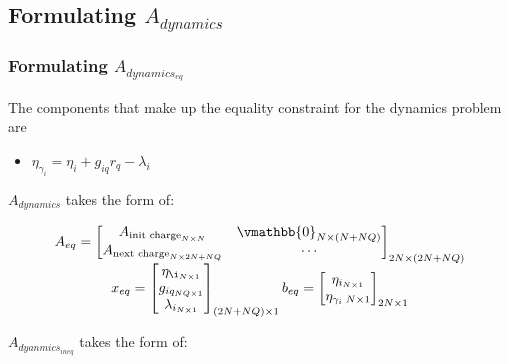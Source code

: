 \documentclass[letterpaper, 10pt, conference]{IEEEtran}
\begin{document}
\subsection{Formulating $A_{dynamics}$}

\subsubsection{Formulating $A_{dynamics_{eq}}$}
The components that make up the equality constraint for the dynamics problem are

\begin{itemize}
    \item
    $\eta_{\gamma_i} = \eta_i + g_{iq} r_q - \lambda_i$
\end{itemize}

$A_{dynamics}$ takes the form of:

\begin{equation}
\begin{array}{c}
	A_{eq} =
	\begin{bmatrix}
		A_{\textrm{init charge}_{N \times N}}       & \vmathbb{0}_{N \times (N+NQ)} \\
		A_{\textrm{next charge}_{N \times 2N + NQ}} & \cdots                       \\
	\end{bmatrix}_{2N \times (2N + NQ)} \\
	x_{eq} =
	\begin{bmatrix}
		\eta_{\i_{N \times 1}}   \\
		g_{iq_{NQ \times 1}}     \\
		\lambda_{i_{N \times 1}} \\
	\end{bmatrix}_{(2N + NQ) \times 1}
	b_{eq} =
	\begin{bmatrix}
		\eta_{i_{N \times 1}} \\
		\eta_{\gamma_{i}\; N \times 1} \\
	\end{bmatrix}_{2N \times 1}
\end{array}
\end{equation}

\(A_{dyanmics_{ineq}}\) takes the form of:
\end{document}
